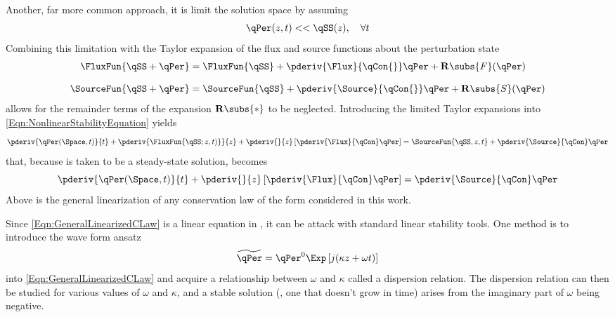 Another, far more common approach, it is limit the solution space by assuming
\begin{equation}
    \qPer(z,t) << \qSS(z),\quad\forall{t}
    \label{Eqn:LinearizationAssumption}
\end{equation}
Combining this limitation with the Taylor expansion of the flux and source functions about the perturbation state
\begin{align}
    \FluxFun {\qSS + \qPer} &= \FluxFun{\qSS}   + \pderiv{\Flux}   {\qCon{}} \qPer + \mathbf{R}\subs{F}(\qPer) \\[0.8em]
    \SourceFun{\qSS + \qPer} &= \SourceFun{\qSS} + \pderiv{\Source}{\qCon{}} \qPer + \mathbf{R}\subs{S}(\qPer)
\end{align}
allows for the remainder terms of the expansion $\mathbf{R}\subs{*}$ to be neglected.
Introducing the limited Taylor expansions into \cref{Eqn:NonlinearStabilityEquation} yields
\begin{equation}
    \pderiv{\qPer(\Space,t)}{t}  + \pderiv{\FluxFun{\qSS;z,t)}}{z} + \pderiv{}{z}\left[\pderiv{\Flux}{\qCon}\qPer\right] = 
    \SourceFun{\qSS,z,t} + \pderiv{\Source}{\qCon}\qPer
\end{equation}
that, because \qSS is taken to be a steady-state solution, becomes
\begin{equation}
    \pderiv{\qPer(\Space,t)}{t}  + \pderiv{}{z}\left[\pderiv{\Flux}{\qCon}\qPer\right] = \pderiv{\Source}{\qCon}\qPer
    \label{Eqn:GeneralLinearizedCLaw}
\end{equation}
Above is the general linearization of any conservation law of the form considered in this work.

Since \cref{Eqn:GeneralLinearizedCLaw} is a linear equation in \qPer, it can be attack with standard linear stability tools.
One method is to introduce the wave form ansatz
\begin{equation}
    \widetilde{\qPer} = \qPer^0 \Exp\left[j(\kappa z + \omega t)\right]
    \label{Eqn:WaveForm}
\end{equation}
into \cref{Eqn:GeneralLinearizedCLaw} and acquire a relationship between $\omega$ and $\kappa$ called a dispersion relation.
The dispersion relation can then be studied for various values of $\omega$ and $\kappa$, and a stable solution (\ie, one that doesn't grow in time) arises from the imaginary part of $\omega$ being negative.

